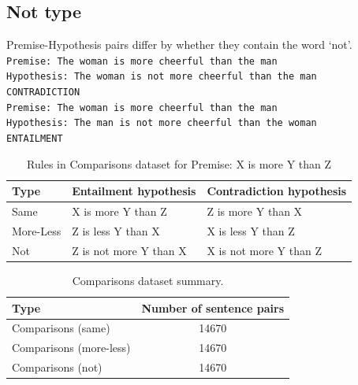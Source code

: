 \subsection{Not type}
Premise-Hypothesis pairs differ by whether they contain the word `not'. \\
{\tt Premise: The woman is more cheerful than the man \\ Hypothesis: The woman is not more cheerful than the man\\ CONTRADICTION \\}{\tt Premise: The woman is more cheerful than the man \\ Hypothesis: The man is not more cheerful than the woman \\ ENTAILMENT} 


\begin{table}[htb]
  \begin{center}
  \begin{tabular}{p{20mm} p{45mm} p{45mm}} 
 \toprule
 Type & Entailment hypothesis & Contradiction hypothesis\\
 \midrule
    
Same & 
X is more Y than Z  &
 Z is more Y than X \\
 
More-Less &
Z is less Y than X  &
X is less Y than Z  \\
 
Not &
Z is not more Y than X  &
X is not more Y than Z  \\
\bottomrule
\end{tabular}
 \caption{Rules in Comparisons dataset for Premise: X is more Y than Z}
  \label{tab:rules}
  \end{center}
\end{table}


\begin{table}[htb]
  \begin{center}
  \begin{tabular}{p{60mm} c} 
 \toprule
 Type & Number of sentence pairs \\ [0.5ex] 
 \midrule
  Comparisons (same)  &  14670\\
 Comparisons (more-less)  &  14670\\
 Comparisons (not)  &  14670\\
 \bottomrule
\end{tabular}
 \caption{Comparisons dataset summary.}
  \label{tab:dataset}
  \end{center}
\end{table}

